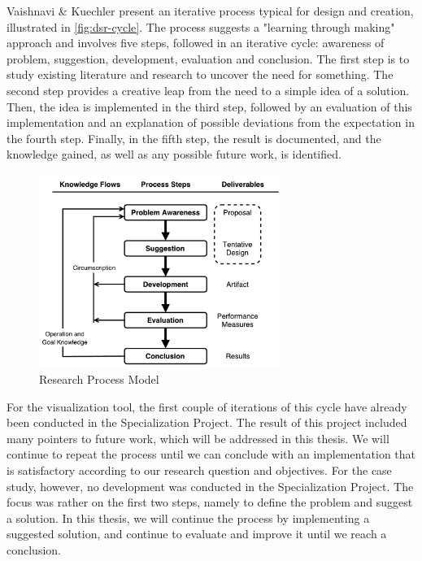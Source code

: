 \noindent Vaishnavi \& Kuechler \cite{designscience} present an iterative process typical for design and creation, illustrated in \autoref{fig:dsr-cycle}. The process suggests a "learning through making" approach and involves five steps, followed in an iterative cycle: awareness of problem, suggestion, development, evaluation and conclusion. The first step is to study existing literature and research to uncover the need for something. The second step provides a creative leap from the need to a simple idea of a solution. Then, the idea is implemented in the third step, followed by an evaluation of this implementation and an explanation of possible deviations from the expectation in the fourth step. Finally, in the fifth step, the result is documented, and the knowledge gained, as well as any possible future work, is identified. \\

\begin{figure}[h!]
    \centering
        \includegraphics[width=0.7\textwidth]{fig/dsr-cycle.pdf}
        \caption{Research Process Model}
        \label{fig:dsr-cycle}
\end{figure}

\noindent For the visualization tool, the first couple of iterations of this cycle have already been conducted in the Specialization Project. The result of this project included many pointers to future work, which will be addressed in this thesis. We will continue to repeat the process until we can conclude with an implementation that is satisfactory according to our research question and objectives. For the case study, however, no development was conducted in the Specialization Project. The focus was rather on the first two steps, namely to define the problem and suggest a solution. In this thesis, we will continue the process by implementing a suggested solution, and continue to evaluate and improve it until we reach a conclusion.\\

